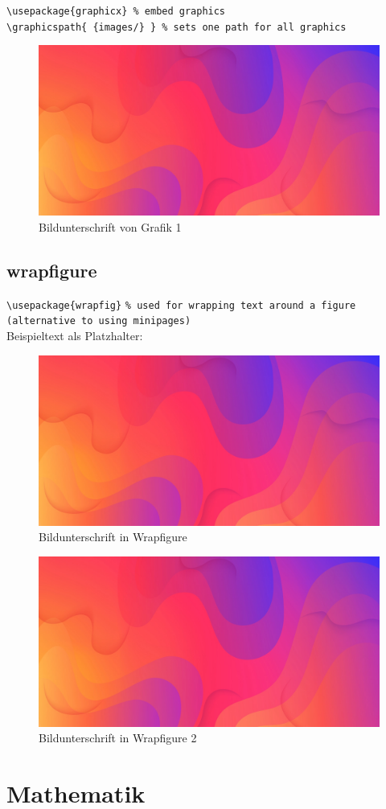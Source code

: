 \documentclass[titlepage, 11pt, a4paper,ngerman]{article}
\begin{document}
\verb|\usepackage{graphicx} % embed graphics|\\
\verb|\graphicspath{ {images/} } % sets one path for all graphics|\\

\begin{figure}[ht] %
	\centering
	\includegraphics[width=.5\linewidth]{image.png}
	\caption[Bildunterschrift im Verzeichnis]{Bildunterschrift von Grafik 1}
	\label{Bild1}
\end{figure}

\newpage

\subsection{wrapfigure}

\noindent
\verb|\usepackage{wrapfig}| \texttt{\% used for wrapping text around a figure\\ (alternative to using minipages)}\\

\noindent
Beispieltext als Platzhalter:\\
\begin{figure}
	\centering
	\includegraphics[width=.25\textwidth]{image.png}
	\caption[Bildunterschrift im Verzeichnis 2]{Bildunterschrift in Wrapfigure}	
\end{figure}
\lipsum[1]
\begin{figure}
	\centering
	\includegraphics[width=.25\textwidth]{image.png}
	\caption[Bildunterschrift im Verzeichnis 3]{Bildunterschrift in Wrapfigure 2}	
\end{figure}
\lipsum[2]

\section{Mathematik}
\end{document}
